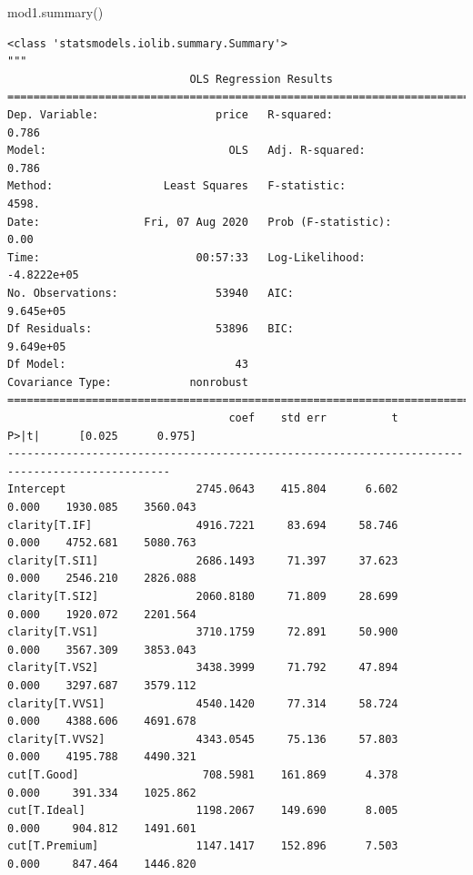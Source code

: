 \documentclass[
  letterpaper,
]{scrbook}
\newenvironment{Shaded}{\begin{snugshade}}{\end{snugshade}}
\newcommand{\NormalTok}[1]{#1}
\begin{document}
\begin{Shaded}
\begin{Highlighting}[]
\NormalTok{mod1.summary()}
\end{Highlighting}
\end{Shaded}

\begin{verbatim}
<class 'statsmodels.iolib.summary.Summary'>
"""
                            OLS Regression Results                            
==============================================================================
Dep. Variable:                  price   R-squared:                       0.786
Model:                            OLS   Adj. R-squared:                  0.786
Method:                 Least Squares   F-statistic:                     4598.
Date:                Fri, 07 Aug 2020   Prob (F-statistic):               0.00
Time:                        00:57:33   Log-Likelihood:            -4.8222e+05
No. Observations:               53940   AIC:                         9.645e+05
Df Residuals:                   53896   BIC:                         9.649e+05
Df Model:                          43                                         
Covariance Type:            nonrobust                                         
===============================================================================================
                                  coef    std err          t      P>|t|      [0.025      0.975]
-----------------------------------------------------------------------------------------------
Intercept                    2745.0643    415.804      6.602      0.000    1930.085    3560.043
clarity[T.IF]                4916.7221     83.694     58.746      0.000    4752.681    5080.763
clarity[T.SI1]               2686.1493     71.397     37.623      0.000    2546.210    2826.088
clarity[T.SI2]               2060.8180     71.809     28.699      0.000    1920.072    2201.564
clarity[T.VS1]               3710.1759     72.891     50.900      0.000    3567.309    3853.043
clarity[T.VS2]               3438.3999     71.792     47.894      0.000    3297.687    3579.112
clarity[T.VVS1]              4540.1420     77.314     58.724      0.000    4388.606    4691.678
clarity[T.VVS2]              4343.0545     75.136     57.803      0.000    4195.788    4490.321
cut[T.Good]                   708.5981    161.869      4.378      0.000     391.334    1025.862
cut[T.Ideal]                 1198.2067    149.690      8.005      0.000     904.812    1491.601
cut[T.Premium]               1147.1417    152.896      7.503      0.000     847.464    1446.820

\end{verbatim}
\end{document}
